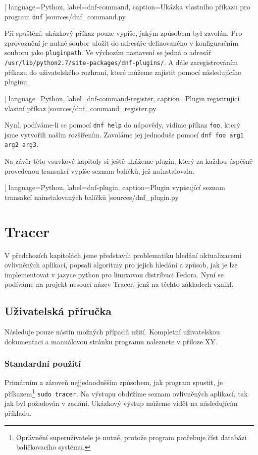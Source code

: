 \documentclass[
  field=inf,
  biblatex,
  glossaries,
  index
]{kidiplom}
\begin{document}
	
	[
		language=Python,
		label=dnf-command,
		caption={Ukázka vlastního příkazu pro program \texttt{dnf}}
	]{sources/dnf_command.py}

	Při spuštění, ukázkový příkaz pouze vypíše, jakým způsobem byl zavolán. Pro zprovoznění je nutné soubor uložit do adresáře definovaného v konfiguračním souboru jako \texttt{pluginpath}. Ve výchozím nastavení se jedná o adresář \texttt{/usr/lib/python2.7/site-packages/dnf-plugins/}. A dále zaregistrováním příkazu do uživatelského rozhraní, které můžeme zajistit pomocí následujícího pluginu.

	
	[
		language=Python,
		label=dnf-command-register,
		caption={Plugin registrující vlastní příkaz}
	]{sources/dnf_command_register.py}

	Nyní, podíváme-li se pomocí \texttt{dnf help} do nápovědy, vidíme příkaz \texttt{foo}, který jsme vytvořili naším rozšířením. Zavoláme jej jednoduše pomocí \texttt{dnf foo arg1 arg2 arg3}.

	Na závěr této vsuvkové kapitoly si ještě ukážeme plugin, který za každou úspěšně provedenou transakcí vypíše seznam balíčků, jež nainstalovala.

	
	[
		language=Python,
		label=dnf-plugin,
		caption={Plugin vypisující seznam transakcí nainstalovaných balíčků}
	]{sources/dnf_plugin.py}



\newpage
\section{Tracer}
	V předchozích kapitolách jsme představili problematiku hledání aktualizacemi ovlivněných aplikací, popsali algoritmy pro jejich hledání a způsob, jak je lze implementovat v jazyce python pro linuxovou distribuci Fedora. Nyní se podíváme na projekt nesoucí název Tracer, jenž na těchto základech vznikl.
	\subsection{Uživatelská příručka}
		Následuje pouze nástin možných případů užití. Kompletní uživatelskou dokumentaci a manuálovou stránku programu naleznete v příloze XY.

		\subsubsection{Standardní použití}
		Primárním a zároveň nejjednodušším způsobem, jak program spustit, je příkazem\footnote{Oprávnění superuživatele je nutné, protože program potřebuje číst databázi balíčkovacího systému.} \texttt{sudo tracer}. Na výstupu obdržíme seznam ovlivněných aplikací, tak jak byl požadován v zadání. Ukázkový výstup můžeme vidět na následujícím příkladu.
\end{document}
